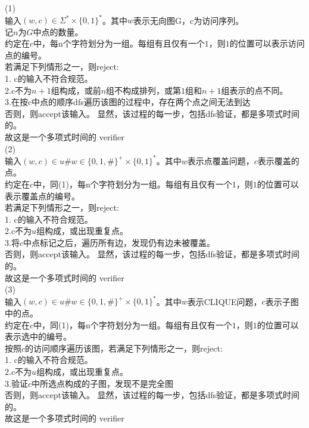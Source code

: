 \documentclass[a4paper, justified]{tufte-handout}
\begin{document}
\begin{solution}
(1)\\
输入$(w,c)\in\Sigma^{*} \times \{0, 1\}^{*}$。其中$w$表示无向图G，c为访问序列。\\
记$n$为$G$中点的数量。\\
约定在$c$中，每n个字符划分为一组。每组有且仅有一个$1$，则$1$的位置可以表示访问点的编号。\\
若满足下列情形之一，则reject:\\
1. c的输入不符合规范。\\
2.c不为$n+1$组构成，或前$n$组不构成排列，或第$1$组和$n+1$组表示的点不同。\\
3.在按c中点的顺序dfs遍历该图的过程中，存在两个点之间无法到达\\
否则，则accept该输入。
显然，该过程的每一步，包括dfs验证，都是多项式时间的。\\
故这是一个多项式时间的 verifier\\
(2)\\
输入$(w,c)\in u\#w\in\{0,1,\#\}^{+} \times \{0, 1\}^{*}$。其中$w$表示点覆盖问题，$c$表示覆盖的点。\\
约定在$c$中，同(1)，每n个字符划分为一组。每组有且仅有一个$1$，则$1$的位置可以表示覆盖点的编号。\\
若满足下列情形之一，则reject:\\
1. c的输入不符合规范。\\
2.c不为$u$组构成，或出现重复点。\\
3.将$c$中点标记之后，遍历所有边，发现仍有边未被覆盖。\\
否则，则accept该输入。
显然，该过程的每一步，包括dfs验证，都是多项式时间的。\\
故这是一个多项式时间的 verifier\\
(3)\\
输入$(w,c)\in u\#w\in\{0,1,\#\}^{+} \times \{0, 1\}^{*}$。其中$w$表示CLIQUE问题，$c$表示子图中的点。\\
约定在$c$中，同(1)，每n个字符划分为一组。每组有且仅有一个$1$，则$1$的位置可以表示选中的编号。\\
按照$c$的访问顺序遍历该图，若满足下列情形之一，则reject:\\
1. c的输入不符合规范。\\
2.c不为$u$组构成，或出现重复点。\\
3.验证$c$中所选点构成的子图，发现不是完全图\\
否则，则accept该输入。
显然，该过程的每一步，包括dfs验证，都是多项式时间的。\\
故这是一个多项式时间的 verifier\\
\end{solution}
\end{document}
